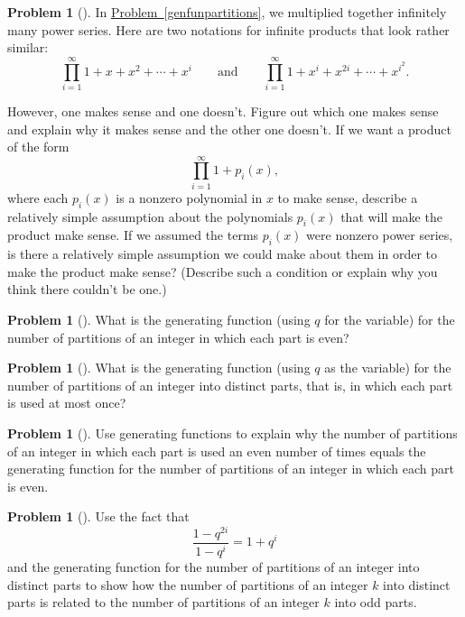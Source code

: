 \documentclass[10pt,]{book}
\theoremstyle{plain}
\theoremstyle{definition}
\newtheorem{activity}[project]{Problem}
\theoremstyle{definition}
\numberwithin{equation}{chapter}
\newcommand{\importantarrow}{\Rightarrow}
\begin{document}
\begin{activity}[]\marginsymbol[-1em]{\pdftooltip{$\importantarrow$}{especially interesting}} \label{activity-204}
In \hyperref[genfunpartitions]{Problem~\ref{genfunpartitions}}, we multiplied together infinitely many power series. Here are two notations for infinite products that look rather similar:%
\begin{equation*}
\prod_{i=1}^\infty 1 + x + x^2 +\cdots+ x^i\qquad\mbox{and}\qquad
\prod_{i=1}^\infty 1 +x^i +x^{2i} +\cdots + x^{i^2}.
\end{equation*}
%
\par
However, one makes sense and one doesn't. Figure out which one makes sense and explain why it makes sense and the other one doesn't. If we want a product of the form%
\begin{equation*}
\prod_{i=1}^\infty 1 +p_i(x),
\end{equation*}
where each \(p_i(x)\) is a nonzero polynomial in \(x\) to make sense, describe a relatively simple assumption about the polynomials \(p_i(x)\) that will make the product make sense. If we assumed the terms \(p_i(x)\) were nonzero power series, is there a relatively simple assumption we could make about them in order to make the product make sense? (Describe such a condition or explain why you think there couldn't be one.)%
\end{activity}
\begin{activity}[] \label{activity-205}
What is the generating function (using \(q\) for the variable) for the number of partitions of an integer in which each part is even?%
\end{activity}
\begin{activity}[] \label{activity-206}
What is the generating function (using \(q\) as the variable) for the number of partitions of an integer into distinct parts, that is, in which each part is used at most once?%
\end{activity}
\begin{activity}[] \label{activity-207}
Use generating functions to explain why the number of partitions of an integer in which each part is used an even number of times equals the generating function for the number of partitions of an integer in which each part is even.%
\end{activity}
\begin{activity}[]\marginsymbol[-1em]{} \label{activity-208}
Use the fact that%
\begin{equation*}
\frac{1-q^{2i}}{1-q^i}= 1+q^i
\end{equation*}
and the generating function for the number of partitions of an integer into distinct parts to show how the number of partitions of an integer \(k\) into distinct parts is related to the number of partitions of an integer \(k\) into odd parts.%
\end{activity}
\end{document}
